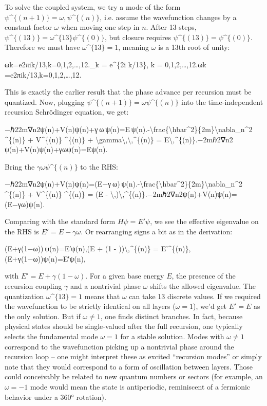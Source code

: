 \documentclass[]{article}
\begin{document}
To solve the coupled system, we try a mode of the form
$\psi\^{}\{(n+1)\} = \omega
,\psi\^{}\{(n)\}$, i.e. assume the wavefunction changes
by a constant factor $\omega$ when moving one step in
$n$​. After 13 steps, $\psi\^{}\{(13)\} =
\omega\^{}\{13\}\psi\^{}\{(0)\}$, but
closure requires $\psi\^{}\{(13)\} =
\psi\^{}\{(0)\}$. Therefore we must have
$\omega\^{}\{13\} = 1$, meaning
$\omega$ is a 13th root of unity:

ωk=e2πik/13,k=0,1,2,\ldots{},12.\omega\_k =
e\^{}\{2\pi i k/13\}, \qquad k =
0,1,2,\dots,12.ωk​=e2πik/13,k=0,1,2,\ldots{},12.​

This is exactly the earlier result that the phase advance per recursion
must be quantized. Now, plugging $\psi\^{}\{(n+1)\} =
\omega \psi\^{}\{(n)\}$ into the
time-independent recursion Schrödinger equation, we get:

−ℏ22m∇n2ψ(n)+V(n)ψ(n)+γ ω ψ(n)=E ψ(n).-\textbackslash{}frac\{\textbackslash{}hbar\^{}2\}\{2m\}\textbackslash{}nabla\_n\^{}2
\psi\^{}\{(n)\} + V\^{}\{(n)\}
\psi\^{}\{(n)\} +
\textbackslash{}gamma\textbackslash{},\omega\textbackslash{},\psi\^{}\{(n)\}
=
E\textbackslash{},\psi\^{}\{(n)\}.−2mℏ2​∇n2​ψ(n)+V(n)ψ(n)+γωψ(n)=Eψ(n).

Bring the $\gamma \omega
\psi\^{}\{(n)\}$ to the RHS:

−ℏ22m∇n2ψ(n)+V(n)ψ(n)=(E−γ ω) ψ(n).-\textbackslash{}frac\{\textbackslash{}hbar\^{}2\}\{2m\}\textbackslash{}nabla\_n\^{}2
\psi\^{}\{(n)\} + V\^{}\{(n)\}
\psi\^{}\{(n)\} = (E -
\gamma\textbackslash{},\omega)\textbackslash{},\psi\^{}\{(n)\}.−2mℏ2​∇n2​ψ(n)+V(n)ψ(n)=(E−γω)ψ(n).​

Comparing with the standard form $H\psi =
E'\psi$, we see the effective eigenvalue on the RHS is
$E' = E - \gamma \omega$. Or rearranging
signs a bit as in the derivation:

(E+γ(1−ω)) ψ(n)=E′ψ(n),(E + \gamma(1 -
\omega))\textbackslash{},\psi\^{}\{(n)\} =
E'\psi\^{}\{(n)\},(E+γ(1−ω))ψ(n)=E′ψ(n),

with $E' = E + \gamma(1-\omega)$​. For a
given base energy $E$, the presence of the recursion coupling
$\gamma$ and a nontrivial phase
$\omega$ shifts the allowed eigenvalue. The
quantization $\omega\^{}\{13\}=1$ means that
$\omega$ can take 13 discrete values. If we required
the wavefunction to be strictly identical on all layers
($\omega=1$), we'd get $E'=E$ as the only solution.
But if $\omega \neq 1$, one finds
distinct branches. In fact, because physical states should be
single-valued after the full recursion, one typically selects the
fundamental mode $\omega=1$ for a stable solution​.
Modes with $\omega \neq 1$ correspond to
the wavefunction picking up a nontrivial phase around the recursion loop
-- one might interpret these as excited ``recursion modes'' or simply
note that they would correspond to a form of oscillation between
layers​. Those could conceivably be related to new quantum numbers or
sectors (for example, an $\omega = -1$ mode would mean
the state is antiperiodic, reminiscent of a fermionic behavior under a
360° rotation).
\end{document}
